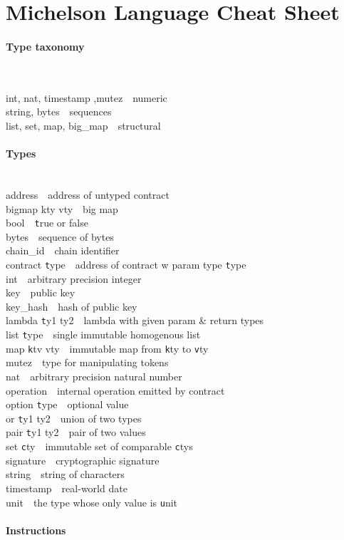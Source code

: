 \documentclass[10pt]{article}
\newcommand{\command}[2]{#1~\dotfill{}~#2\\} %
\newcommand{\sectiontitle}[1]{\paragraph{#1} \ \\} %
\begin{document}
\section*{Michelson Language Cheat Sheet}
\begin{multicols}{3}
  \sectiontitle{Type taxonomy}\noindent\begin{raggedright}
    \command{int, nat, timestamp ,mutez}{numeric}
    \command{string, bytes}{sequences}
    \command{list, set, map, big\_map}{structural}
  \end{raggedright}
  \sectiontitle{Types}
  \noindent
  \command{address}{address of untyped contract}
  \command{bigmap kty vty}{big map}
  \command{bool}{{\texttt true} or false}
  \command{bytes}{sequence of bytes}
  \command{chain\_id}{chain identifier}
  \command{contract {\texttt type}}{address of contract w param type {\texttt type}}
  \command{int}{arbitrary precision integer}
  \command{key}{public key}
  \command{key\_hash}{hash of public key}
  \command{lambda {\texttt ty1 ty2}}{lambda with given param \& return types}
  \command{list {\texttt type}}{single immutable homogenous list}
  \command{map {\texttt ktv vty}}{immutable map from {\texttt kty} to {\texttt vty}}
  \command{mutez}{type for manipulating tokens}
  \command{nat}{arbitrary precision natural number}
  \command{operation}{internal operation emitted by contract}
  \command{option {\texttt type}}{optional value}
  \command{or {\texttt ty1 ty2}}{union of two types}
  \command{pair {\texttt ty1 ty2}}{pair of two values}
  \command{set {\texttt cty}}{immutable set of comparable {\texttt cty}s}
  \command{signature}{cryptographic signature}
  \command{string}{string of characters}
  \command{timestamp}{real-world date}
  \command{unit}{the type whose only value is {\texttt unit}}
  \sectiontitle{Instructions}\begin{raggedright}\noindent\end{raggedright}
\end{multicols}

\end{document}
